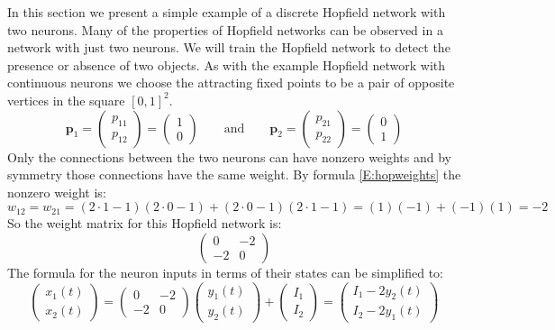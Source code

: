    In this section we present a simple example of a discrete Hopfield network
with two neurons.  Many of the properties of Hopfield networks can be observed
in a network with just two neurons.  We will train the Hopfield network to 
detect the presence or absence of two objects.  As with the example Hopfield 
network with continuous neurons we choose the attracting fixed points to be a 
pair of opposite vertices in the square $[0,1]^2$.  
\begin{equation*}
\boldsymbol{p}_1 = 
\begin{pmatrix}
p_{11} \\ p_{12}
\end{pmatrix}
=
\begin{pmatrix}
1 \\ 0
\end{pmatrix}
\qquad \mathrm{and} \qquad
\boldsymbol{p}_2 = 
\begin{pmatrix}
p_{21} \\ p_{22}
\end{pmatrix}
=
\begin{pmatrix}
0 \\ 1
\end{pmatrix}
\end{equation*}
Only the connections between the two neurons can have nonzero weights and by 
symmetry those connections have the same weight.  By formula 
\eqref{E:hopweights} the nonzero weight is:
\begin{equation*}
w_{12} = w_{21} = 
 (2 \cdot 1 - 1)(2  \cdot 0 - 1) + (2 \cdot 0 - 1)(2 \cdot 1  - 1)
 = (1)(-1) + (-1)(1) = -2
\end{equation*}
So the weight matrix for this Hopfield network is:
\begin{equation*}
\begin{pmatrix}
 0 & -2 \\
-2 &  0 
\end{pmatrix}
\end{equation*}
The formula for the neuron inputs in terms of their states can be simplified 
to:
\begin{equation*}
\begin{pmatrix}
x_1(t) \\ x_2(t)
\end{pmatrix}
=
\begin{pmatrix}
 0 & -2 \\
-2 &  0 
\end{pmatrix}
\begin{pmatrix}
y_1(t) \\ y_2(t)
\end{pmatrix}
+
\begin{pmatrix}
I_1 \\ I_2
\end{pmatrix}
=
\begin{pmatrix}
I_1 - 2 y_2(t) \\ I_2 - 2 y_1(t)
\end{pmatrix}
\end{equation*}

